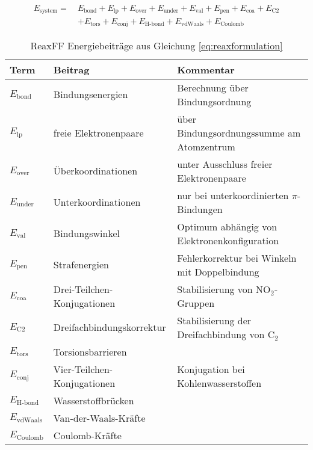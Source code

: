 \begin{align}
  \label{eq:reaxformulation}
  E_\text{system} =~& E_\text{bond} + E_\text{lp} + E_\text{over} + E_\text{under} + E_\text{val} + E_\text{pen} + E_\text{coa} + E_\text{C2} \\
  \nonumber  & + E_\text{tors} + E_\text{conj} + E_\text{H-bond} + E_\text{vdWaals} + E_\text{Coulomb}
\end{align}


\begin{table}
  \caption[ReaxFF Energiebeiträge]{ReaxFF Energiebeiträge aus Gleichung \ref{eq:reaxformulation}}
  \label{tab:reaxenergies}
  \begin{tabularx}{\textwidth}{|llX|}
    \hline
    \textbf{Term}      & \textbf{Beitrag}            & \textbf{Kommentar}                            \\
    \hline
    $E_\text{bond}$    & Bindungsenergien            & Berechnung über Bindungsordnung               \\
    $E_\text{lp}$      & freie Elektronenpaare       & über Bindungsordnungssumme am Atomzentrum     \\
    $E_\text{over}$    & Überkoordinationen          & unter Ausschluss freier Elektronenpaare       \\
    $E_\text{under}$   & Unterkoordinationen         & nur bei unterkoordinierten $\pi$-Bindungen    \\
    $E_\text{val}$     & Bindungswinkel              & Optimum abhängig von Elektronenkonfiguration  \\
    $E_\text{pen}$     & Strafenergien               & Fehlerkorrektur bei Winkeln mit Doppelbindung \\
    $E_\text{coa}$     & Drei-Teilchen-Konjugationen & Stabilisierung von NO$_2$-Gruppen             \\
    $E_\text{C2}$      & Dreifachbindungskorrektur   & Stabilisierung der Dreifachbindung von C$_2$  \\
    $E_\text{tors}$    & Torsionsbarrieren           &                                               \\
    $E_\text{conj}$    & Vier-Teilchen-Konjugationen & Konjugation bei Kohlenwasserstoffen           \\
    $E_\text{H-bond}$  & Wasserstoffbrücken          &                                               \\
    $E_\text{vdWaals}$ & Van-der-Waals-Kräfte        &                                               \\
    $E_\text{Coulomb}$ & Coulomb-Kräfte              &                                               \\
    \hline
  \end{tabularx}
\end{table}

